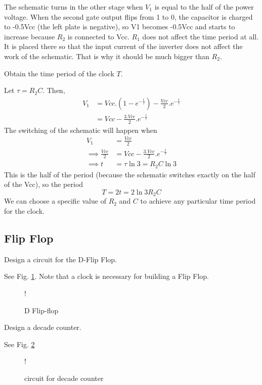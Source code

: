 \documentclass[journal,12pt,twocolumn]{IEEEtran}
\begin{document}
The schematic turns in the other stage when $V_1$ is equal to the half of the power voltage.
When the second gate output flips from 1 to 0, the capacitor is charged to -0.5Vcc (the left plate is negative), so V1 becomes -0.5Vcc and starts to increase because $R_2$ is connected to Vcc.  $R_1$ does not affect the time period at all. It is placed there so that the input current of the inverter does not affect the work of the schematic. That is why it should be much bigger than $R_2$.
\begin{problem}
Obtain the time period of the clock $T$.
\end{problem}
\solution Let $\tau = R_2C$.  Then,
\begin{align}
{V_1} &= Vcc.(1-e^{-\frac{t}{\tau}}) - \frac{Vcc}{2} .e^{-\frac{t}{\tau}}
\\
&= Vcc - \frac{3.Vcc}{2}.e^{-\frac{t}{\tau}}
\end{align}
%
The switching of the schematic will happen when 
%
\begin{align}
V_1 &= \frac{Vcc}{2}
\\ 
\implies  \frac{Vcc}{2} &= Vcc - \frac{3.Vcc}{2}.e^{-\frac{t}{\tau}}
\\
\implies t &= \tau\ln3 = {R_2}C\ln3 
\end{align}
%
This is the half of the period (because the schematic switches exactly on the half of the Vcc), so the period
\begin{equation}
T = 2t = 2\ln3{R_2}C
\end{equation}
We can choose a specific value of ${R_2}$ and $C$ to achieve any particular time period for the clock.
%
\subsection{ Flip Flop}
%
\begin{problem}
Design a circuit for the D-Flip Flop.
\end{problem}
\solution See Fig. \ref{fig:dflipflop}.  Note that a clock is necessary for building a Flip Flop.
\begin{figure}[!h]
\centering
\resizebox {\columnwidth} {!} {

}
\caption{D Flip-flop}
\label{fig:dflipflop}
\end{figure}
%
\begin{problem}
Design a decade counter.
\end{problem}
\solution See Fig. \ref{fig:decade}
\begin{figure}[!h]
\centering
\resizebox {\columnwidth} {!} {

}
\caption{circuit for decade counter}
\label{fig:decade}
\end{figure}
\end{document}
